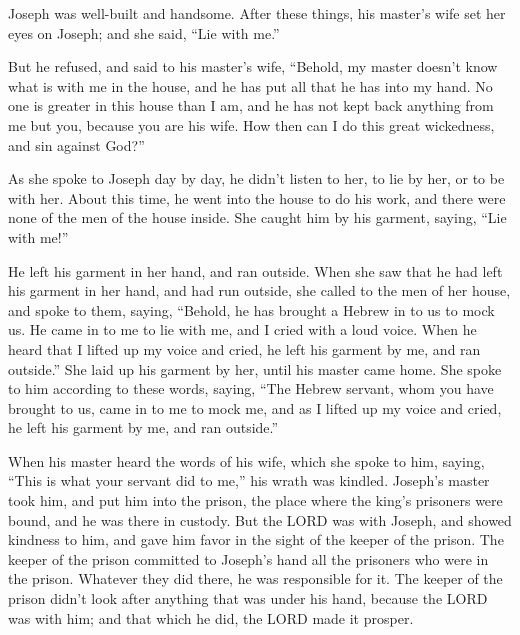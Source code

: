 Joseph was well-built and handsome.   \myverse{}After these things, his master’s wife set her eyes on Joseph; and she said, “Lie with me.”

\myverse{}But he refused, and said to his master’s wife, “Behold, my master doesn’t know what is with me in the house, and he has put all that he has into my hand.   \myverse{}No one is greater in this house than I am, and he has not kept back anything from me but you, because you are his wife. How then can I do this great wickedness, and sin against God?”

\myverse{}As she spoke to Joseph day by day, he didn’t listen to her, to lie by her, or to be with her.   \myverse{}About this time, he went into the house to do his work, and there were none of the men of the house inside.   \myverse{}She caught him by his garment, saying, “Lie with me!”

He left his garment in her hand, and ran outside.   \myverse{}When she saw that he had left his garment in her hand, and had run outside,   \myverse{}she called to the men of her house, and spoke to them, saying, “Behold, he has brought a Hebrew in to us to mock us. He came in to me to lie with me, and I cried with a loud voice.   \myverse{}When he heard that I lifted up my voice and cried, he left his garment by me, and ran outside.”   \myverse{}She laid up his garment by her, until his master came home.   \myverse{}She spoke to him according to these words, saying, “The Hebrew servant, whom you have brought to us, came in to me to mock me,   \myverse{}and as I lifted up my voice and cried, he left his garment by me, and ran outside.”

\myverse{}When his master heard the words of his wife, which she spoke to him, saying, “This is what your servant did to me,” his wrath was kindled.   \myverse{}Joseph’s master took him, and put him into the prison, the place where the king’s prisoners were bound, and he was there in custody.   \myverse{}But the LORD was with Joseph, and showed kindness to him, and gave him favor in the sight of the keeper of the prison.   \myverse{}The keeper of the prison committed to Joseph’s hand all the prisoners who were in the prison. Whatever they did there, he was responsible for it.   \myverse{}The keeper of the prison didn’t look after anything that was under his hand, because the LORD was with him; and that which he did, the LORD made it prosper.

